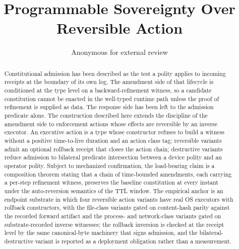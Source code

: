 \documentclass[11pt,letterpaper]{article}
\title{Programmable Sovereignty Over Reversible Action}
\author{Anonymous for external review}
\date{}
\begin{document}
\maketitle

\begin{abstract}
Constitutional admission has been described as the test a polity applies
to incoming receipts at the boundary of its own log. The amendment side
of that lifecycle is conditioned at the type level on a backward-refinement
witness, so a candidate constitution cannot be enacted in the well-typed
runtime path unless the proof of refinement is supplied as data. The
response side has been left to the admission predicate alone. The
construction described here extends the discipline of the amendment
side to enforcement actions whose effects are reversible by an inverse
executor. An executive action is a type whose constructor refuses to
build a witness without a positive time-to-live duration and an action
class tag; reversible variants admit an optional rollback receipt that
closes the action chain; destructive variants reduce admission to
bilateral predicate intersection between a device polity and an operator
polity. Subject to mechanized confirmation, the load-bearing claim is a
composition theorem stating that a chain of time-bounded amendments,
each carrying a per-step refinement witness, preserves the baseline
constitution at every instant under the auto-reversion semantics of the
TTL window. The empirical anchor is an endpoint substrate in which four
reversible action variants have real OS executors with rollback
constructors, with the file-class variants gated on content-hash parity
against the recorded forward artifact and the process- and network-class
variants gated on substrate-recorded inverse witnesses; the rollback
inversion is checked at the receipt level by the same canonical-byte
machinery that signs admission, and the bilateral-destructive variant
is reported as a deployment obligation rather than a measurement.
\end{abstract}











\end{document}
